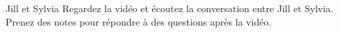 \begin{frame}{Jill et Sylvia}
  Regardez la vidéo et écoutez la conversation entre Jill et Sylvia.
  Prenez des notes pour répondre à des questions après la vidéo.
\end{frame}